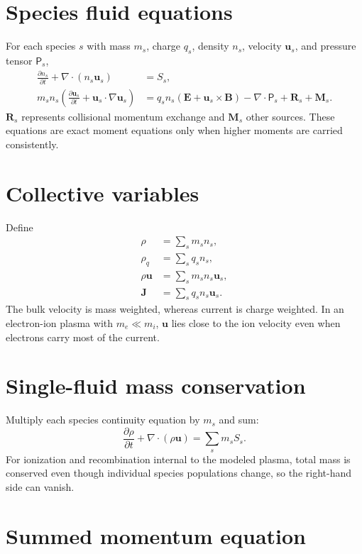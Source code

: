 \documentclass[11pt]{article}
\begin{document}
\section{Species fluid equations}

For each species $s$ with mass $m_s$, charge $q_s$, density $n_s$, velocity $\mathbf u_s$, and pressure tensor $\mathsf P_s$,
\begin{align}
\frac{\partial n_s}{\partial t}+\nabla\cdot(n_s\mathbf u_s)&=S_s,\\
m_sn_s\left(\frac{\partial\mathbf u_s}{\partial t}
+\mathbf u_s\cdot\nabla\mathbf u_s\right)
&=q_sn_s(\mathbf E+\mathbf u_s\times\mathbf B)
-\nabla\cdot\mathsf P_s+\mathbf R_s+\mathbf M_s.
\end{align}
$\mathbf R_s$ represents collisional momentum exchange and $\mathbf M_s$ other sources. These equations are exact moment equations only when higher moments are carried consistently.


\section{Collective variables}

Define
\begin{align}
\rho&=\sum_s m_sn_s,\\
\rho_q&=\sum_s q_sn_s,\\
\rho\mathbf u&=\sum_s m_sn_s\mathbf u_s,\\
\mathbf J&=\sum_s q_sn_s\mathbf u_s.
\end{align}
The bulk velocity is mass weighted, whereas current is charge weighted. In an electron-ion plasma with $m_e\ll m_i$, $\mathbf u$ lies close to the ion velocity even when electrons carry most of the current.


\section{Single-fluid mass conservation}

Multiply each species continuity equation by $m_s$ and sum:
\begin{equation}
\frac{\partial\rho}{\partial t}+\nabla\cdot(\rho\mathbf u)
=\sum_sm_sS_s.
\end{equation}
For ionization and recombination internal to the modeled plasma, total mass is conserved even though individual species populations change, so the right-hand side can vanish.


\section{Summed momentum equation}
\end{document}
